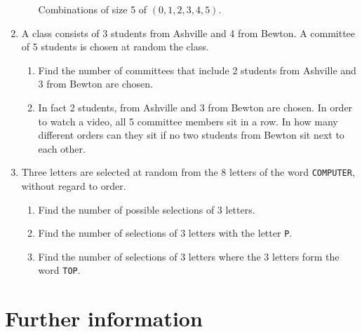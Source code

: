 \begin{enumerate}
\begin{enumerate}
Combinations of size 5 of \((0, 1, 2, 3, 4, 5)\).

\end{enumerate}

\item 

A class consists of 3 students from Ashville and 4 from Bewton. A committee of 5 students is chosen at random the class.
\begin{enumerate}

\item 

Find the number of committees that include 2 students from Ashville and 3 from Bewton are chosen.

\item 

In fact 2 students, from Ashville and 3 from Bewton are chosen. In order to watch a video, all 5 committee members sit in a row. In how many different orders can they sit if no two students from Bewton sit next to each other.

\end{enumerate}

\item 

Three letters are selected at random from the 8 letters of the word \texttt{COMPUTER}, without regard to order.
\begin{enumerate}

\item 

Find the number of possible selections of 3 letters.

\item 

Find the number of selections of 3 letters with the letter \texttt{P}.

\item 

Find the number of selections of 3 letters where the 3 letters form the word \texttt{TOP}.

\end{enumerate}

\end{enumerate}

\section{Further information}
\label{\detokenize{tools-for-mathematics/05-combinations-permutations/why/main:further-information}}\label{\detokenize{tools-for-mathematics/05-combinations-permutations/why/main::doc}}

